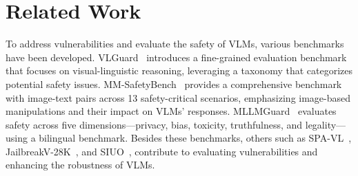 
\section{Related Work}

To address vulnerabilities and evaluate the safety of VLMs, various benchmarks have been developed. VLGuard~\cite{vlguard2024} introduces a fine-grained evaluation benchmark that focuses on visual-linguistic reasoning, leveraging a taxonomy that categorizes potential safety issues. MM-SafetyBench~\cite{mmsafetybench2025} provides a comprehensive benchmark with image-text pairs across 13 safety-critical scenarios, emphasizing image-based manipulations and their impact on VLMs' responses. MLLMGuard~\cite{mllmguard2024} evaluates safety across five dimensions—privacy, bias, toxicity, truthfulness, and legality—using a bilingual benchmark. Besides these benchmarks, others such as SPA-VL~\cite{spavl2024}, JailbreakV-28K~\cite{jailbreak28k2024}, and SIUO~\cite{siuo2024}, contribute to evaluating vulnerabilities and enhancing the robustness of VLMs.

